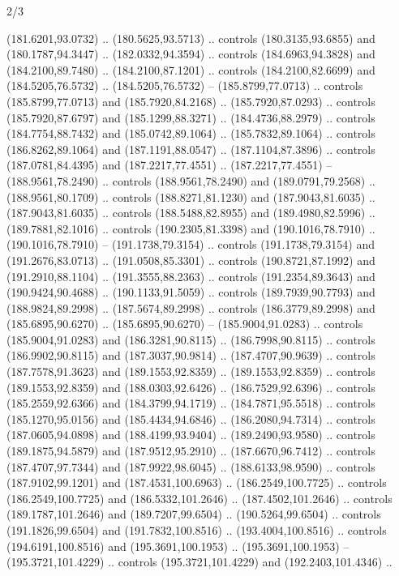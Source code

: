 \begin{flagdescription}{2/3}
\begin{scope}[xshift=0.5\flaglength,yshift=0.5\flagwidth,scale=\flagwidth/180]
\begin{scope}[y=0.8pt, x=0.8pt, yscale=-1,shift={(-168.75,-108.75)}]
  (181.6201,93.0732) .. (180.5625,93.5713) .. controls (180.3135,93.6855) and
  (180.1787,94.3447) .. (182.0332,94.3594) .. controls (184.6963,94.3828) and
  (184.2100,89.7480) .. (184.2100,87.1201) .. controls (184.2100,82.6699) and
  (184.5205,76.5732) .. (184.5205,76.5732) -- (185.8799,77.0713) .. controls
  (185.8799,77.0713) and (185.7920,84.2168) .. (185.7920,87.0293) .. controls
  (185.7920,87.6797) and (185.1299,88.3271) .. (184.4736,88.2979) .. controls
  (184.7754,88.7432) and (185.0742,89.1064) .. (185.7832,89.1064) .. controls
  (186.8262,89.1064) and (187.1191,88.0547) .. (187.1104,87.3896) .. controls
  (187.0781,84.4395) and (187.2217,77.4551) .. (187.2217,77.4551) --
  (188.9561,78.2490) .. controls (188.9561,78.2490) and (189.0791,79.2568) ..
  (188.9561,80.1709) .. controls (188.8271,81.1230) and (187.9043,81.6035) ..
  (187.9043,81.6035) .. controls (188.5488,82.8955) and (189.4980,82.5996) ..
  (189.7881,82.1016) .. controls (190.2305,81.3398) and (190.1016,78.7910) ..
  (190.1016,78.7910) -- (191.1738,79.3154) .. controls (191.1738,79.3154) and
  (191.2676,83.0713) .. (191.0508,85.3301) .. controls (190.8721,87.1992) and
  (191.2910,88.1104) .. (191.3555,88.2363) .. controls (191.2354,89.3643) and
  (190.9424,90.4688) .. (190.1133,91.5059) .. controls (189.7939,90.7793) and
  (188.9824,89.2998) .. (187.5674,89.2998) .. controls (186.3779,89.2998) and
  (185.6895,90.6270) .. (185.6895,90.6270) -- (185.9004,91.0283) .. controls
  (185.9004,91.0283) and (186.3281,90.8115) .. (186.7998,90.8115) .. controls
  (186.9902,90.8115) and (187.3037,90.9814) .. (187.4707,90.9639) .. controls
  (187.7578,91.3623) and (189.1553,92.8359) .. (189.1553,92.8359) .. controls
  (189.1553,92.8359) and (188.0303,92.6426) .. (186.7529,92.6396) .. controls
  (185.2559,92.6366) and (184.3799,94.1719) .. (184.7871,95.5518) .. controls
  (185.1270,95.0156) and (185.4434,94.6846) .. (186.2080,94.7314) .. controls
  (187.0605,94.0898) and (188.4199,93.9404) .. (189.2490,93.9580) .. controls
  (189.1875,94.5879) and (187.9512,95.2910) .. (187.6670,96.7412) .. controls
  (187.4707,97.7344) and (187.9922,98.6045) .. (188.6133,98.9590) .. controls
  (187.9102,99.1201) and (187.4531,100.6963) .. (186.2549,100.7725) .. controls
  (186.2549,100.7725) and (186.5332,101.2646) .. (187.4502,101.2646) .. controls
  (189.1787,101.2646) and (189.7207,99.6504) .. (190.5264,99.6504) .. controls
  (191.1826,99.6504) and (191.7832,100.8516) .. (193.4004,100.8516) .. controls
  (194.6191,100.8516) and (195.3691,100.1953) .. (195.3691,100.1953) --
  (195.3721,101.4229) .. controls (195.3721,101.4229) and (192.2403,101.4346) ..

\end{scope}
\end{scope}
\end{flagdescription}
